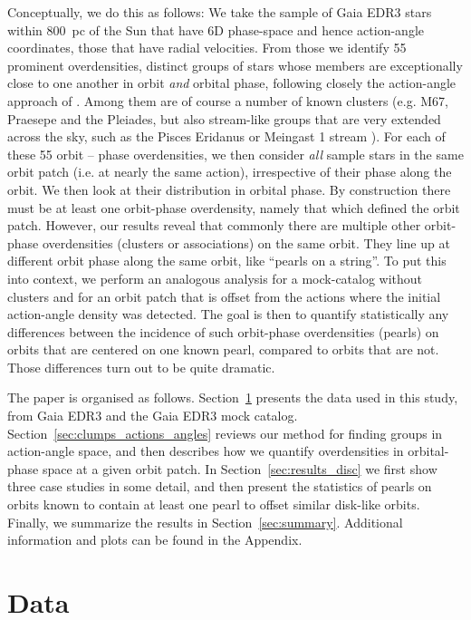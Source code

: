 \documentclass[twocolumn]{aastex631}
\begin{document}
Conceptually, we do this as follows: We take the sample of Gaia EDR3 stars within 800~pc of the Sun that have 6D phase-space and hence action-angle coordinates, those that have radial velocities. From those we identify 55 prominent overdensities, distinct groups of stars whose members are exceptionally close to one another in orbit \emph{and} orbital phase, following closely the action-angle approach of \citet{2020MNRAS.495.4098C}. Among them are of course a number of known clusters (e.g. M67, Praesepe and the Pleiades, but also stream-like groups that are very extended across the sky, such as the Pisces Eridanus or Meingast 1 stream \citep{2019A&A...622L..13M}). For each of these 55 orbit -- phase overdensities, we then consider \emph{all} sample stars in the same orbit patch (i.e. at nearly the same action), irrespective of their phase along the orbit. We then look at their distribution in orbital phase.  By construction there must be at least one orbit-phase overdensity, namely that which defined the orbit patch. However, our results reveal that commonly there are multiple other orbit-phase overdensities (clusters or associations) on the same orbit. They line up at different orbit phase along the same orbit, like ``pearls on a string''. To put this into context, we perform an analogous analysis for a mock-catalog without clusters \citep{2020PASP..132g4501R} and for an orbit patch that is offset from the actions where the initial action-angle density was detected. The goal is then to quantify statistically any differences between the incidence of such  orbit-phase overdensities (pearls) on orbits that are centered on one known pearl, compared to orbits that are not. Those differences turn out to be quite dramatic.

The paper is organised as follows. Section~\ref{sec:data} presents the data used in this study, from Gaia EDR3 and the Gaia EDR3 mock catalog. Section~\ref{sec:clumps_actions_angles} reviews our method for finding groups in action-angle space, and then describes how we quantify overdensities in orbital-phase space at a given orbit patch. In Section~\ref{sec:results_disc} we first show three case studies in some detail, and then present the statistics of pearls on orbits known to contain at least one pearl to offset similar disk-like orbits. Finally, we summarize the results in Section~\ref{sec:summary}. Additional information and plots can be found in the Appendix.

\section{Data}
\label{sec:data}
\end{document}
